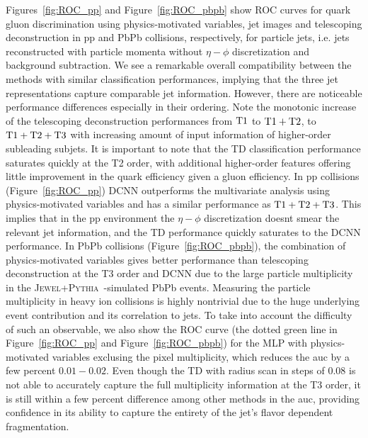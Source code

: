 \documentclass[notoc]{JHEP3}
\newcommand{\jwpy}{\textsc{Jewel+Pythia}~}
\begin{document}
Figures~\ref{fig:ROC_pp} and Figure~\ref{fig:ROC_pbpb} show ROC curves for quark gluon discrimination using physics-motivated variables, jet images and telescoping deconstruction in pp and PbPb collisions, respectively, for particle jets, i.e. jets reconstructed with particle momenta without $\eta-\phi$ discretization and background subtraction. We see a remarkable overall compatibility between the methods with similar classification performances, implying that the three jet representations capture comparable jet information. However, there are noticeable performance differences especially in their ordering. Note the monotonic increase of the telescoping deconstruction performances from $\rm T1$ to $\rm T1+T2$, to $\rm T1+T2+T3$ with increasing amount of input information of higher-order subleading subjets. It is important to note that the TD classification performance saturates quickly at the T2 order, with additional higher-order features offering little improvement in the quark efficiency given a gluon efficiency. In pp collisions (Figure~\ref{fig:ROC_pp}) DCNN outperforms the multivariate analysis using physics-motivated variables and has a similar performance as $\rm T1+T2+T3$. This implies that in the pp environment the $\eta-\phi$ discretization doesnt smear the relevant jet information, and the TD performance quickly saturates to the DCNN performance. In PbPb collisions (Figure~\ref{fig:ROC_pbpb}), the combination of physics-motivated variables gives better performance than telescoping deconstruction at the T3 order and DCNN due to the large particle multiplicity in the \jwpy-simulated PbPb events. Measuring the particle multiplicity in heavy ion collisions is highly nontrivial due to the huge underlying event contribution and its correlation to jets. To take into account the difficulty of such an observable, we also show the ROC curve (the dotted green line in Figure~\ref{fig:ROC_pp} and Figure~\ref{fig:ROC_pbpb}) for the MLP with physics-motivated variables exclusing the pixel multiplicity, which reduces the auc by a few percent $0.01 - 0.02$. Even though the TD with radius scan in steps of 0.08 is not able to accurately capture the full multiplicity information at the T3 order, it is still within a few percent difference among other methods in the auc, providing confidence in its ability to capture the entirety of the jet's flavor dependent fragmentation. %
\end{document}
